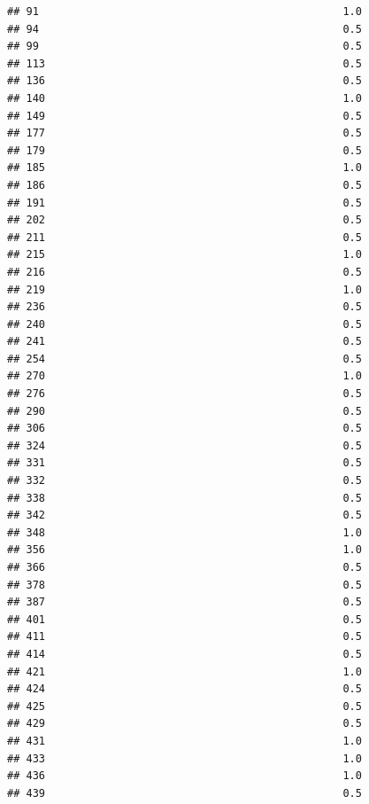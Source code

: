 \documentclass[
]{article}
\begin{document}
\begin{verbatim}
## 91                                                1.0
## 94                                                0.5
## 99                                                0.5
## 113                                               0.5
## 136                                               0.5
## 140                                               1.0
## 149                                               0.5
## 177                                               0.5
## 179                                               0.5
## 185                                               1.0
## 186                                               0.5
## 191                                               0.5
## 202                                               0.5
## 211                                               0.5
## 215                                               1.0
## 216                                               0.5
## 219                                               1.0
## 236                                               0.5
## 240                                               0.5
## 241                                               0.5
## 254                                               0.5
## 270                                               1.0
## 276                                               0.5
## 290                                               0.5
## 306                                               0.5
## 324                                               0.5
## 331                                               0.5
## 332                                               0.5
## 338                                               0.5
## 342                                               0.5
## 348                                               1.0
## 356                                               1.0
## 366                                               0.5
## 378                                               0.5
## 387                                               0.5
## 401                                               0.5
## 411                                               0.5
## 414                                               0.5
## 421                                               1.0
## 424                                               0.5
## 425                                               0.5
## 429                                               0.5
## 431                                               1.0
## 433                                               1.0
## 436                                               1.0
## 439                                               0.5

\end{verbatim}
\end{document}
